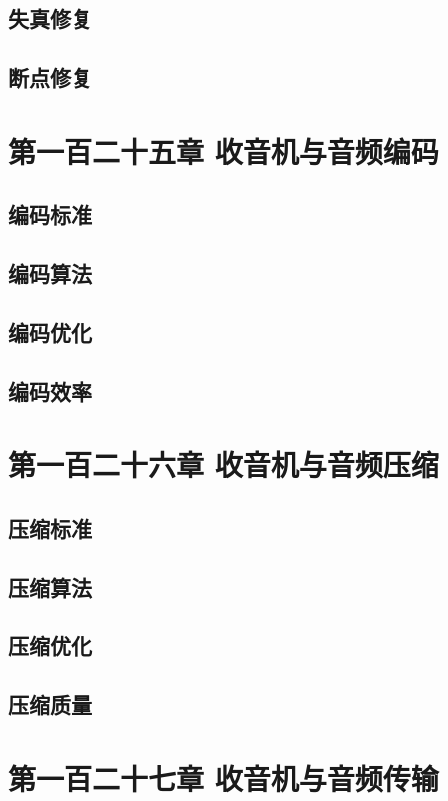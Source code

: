 \documentclass[12pt,UTF8]{ctexbook}
\begin{document}
\section{失真修复}
\section{断点修复}

\chapter{第一百二十五章 收音机与音频编码}

\section{编码标准}
\section{编码算法}
\section{编码优化}
\section{编码效率}

\chapter{第一百二十六章 收音机与音频压缩}

\section{压缩标准}
\section{压缩算法}
\section{压缩优化}
\section{压缩质量}

\chapter{第一百二十七章 收音机与音频传输}
\end{document}
